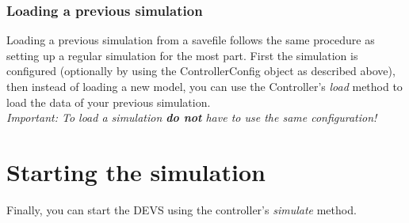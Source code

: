 \subsubsection{Loading a previous simulation}
Loading a previous simulation from a savefile follows the same procedure as setting up a regular simulation for the most part. First the simulation is configured (optionally by using the ControllerConfig object as described above), then instead of loading a new model, you can use the Controller's \textsl{load} method to load the data of your previous simulation.\\
\emph{Important: To load a simulation \textbf{do not} have to use the same configuration!}

\section{Starting the simulation}
Finally, you can start the DEVS using the controller's \textsl{simulate} method.
